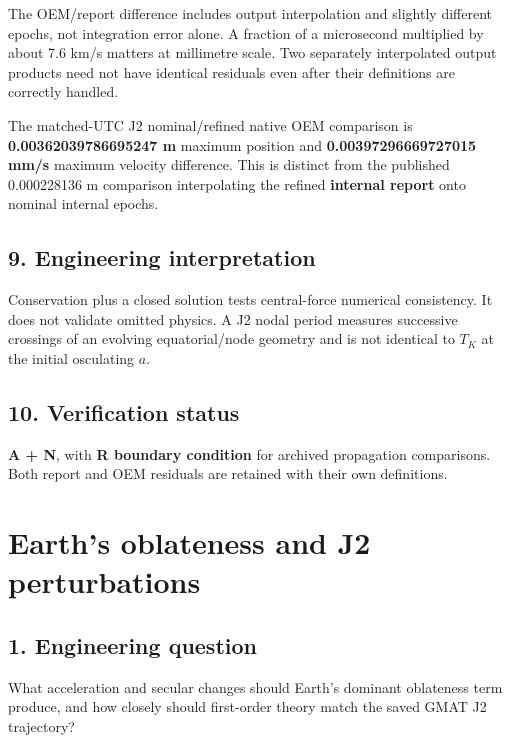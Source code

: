 \documentclass[10pt,a4paper]{article}
\numberwithin{equation}{section}
\begin{document}
\begin{sloppypar}The OEM/report difference includes output interpolation and slightly different epochs, not integration error alone. A fraction of a microsecond multiplied by about 7.6 km/s matters at millimetre scale. Two separately interpolated output products need not have identical residuals even after their definitions are correctly handled.\end{sloppypar}


\begin{sloppypar}The matched-UTC J2 nominal/refined native OEM comparison is \textbf{0.00362039786695247 m} maximum position and \textbf{0.00397296669727015 mm/s} maximum velocity difference. This is distinct from the published 0.000228136 m comparison interpolating the refined \textbf{internal report} onto nominal internal epochs.\end{sloppypar}


\subsection*{9. Engineering interpretation}
\begin{sloppypar}Conservation plus a closed solution tests central-force numerical consistency. It does not validate omitted physics. A J2 nodal period measures successive crossings of an evolving equatorial/node geometry and is not identical to \(T_K\) at the initial osculating \(a\).\end{sloppypar}


\subsection*{10. Verification status}
\begin{sloppypar}\textbf{A + N}, with \textbf{R boundary condition} for archived propagation comparisons. Both report and OEM residuals are retained with their own definitions.\end{sloppypar}




\clearpage\section{Earth's oblateness and J2 perturbations}\label{ch:3}

\subsection*{1. Engineering question}
\begin{sloppypar}What acceleration and secular changes should Earth's dominant oblateness term produce, and how closely should first-order theory match the saved GMAT J2 trajectory?\end{sloppypar}
\end{document}
